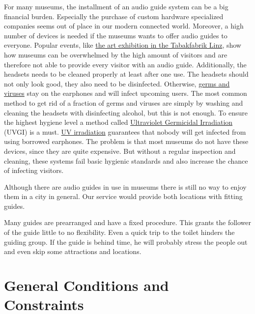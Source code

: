 \documentclass[12pt]{article}
\theoremstyle{definition}
\newenvironment{text}{
}{}
\begin{document}
\begin{text}
For many museums, the installment of an audio guide system can be a big financial burden. Especially the purchase of  custom hardware specialized companies seems out of place in our modern connected world. Moreover, a  high number of devices is needed if the museums wants to offer audio guides to everyone. Popular events, like \href{https://www.tips.at/nachrichten/linz/kultur/459167-oberoesterreich-im-kunstfieber-schon-ueber-15-000-besucher-kamen-zu-den-grossen-meistern-in-die-tabakfabrik-linz}{the art exhibition in the Tabakfabrik Linz}, show how museums can be overwhelmed by the high amount of visitors and are therefore not able to provide every visitor with an audio guide.
Additionally, the headsets needs to be cleaned properly at least after one use.
The headsets should not only look good, they also need to be disinfected. Otherwise, \href{https://www.sciencedirect.com/science/article/abs/pii/S019607098580048X}{germs and viruses} stay on the earphones and will infect upcoming users. The most common method to get rid of a fraction of germs and viruses are simply by washing and cleaning the headsets with disinfecting alcohol, but this is not enough. To ensure the highest hygiene level a method called \href{https://www.ncbi.nlm.nih.gov/pmc/articles/PMC6379899/}{Ultraviolet Germicidal Irradiation} (UVGI) is a must. \href{https://pubs.asha.org/doi/abs/10.1044/jshr.1202.326}{UV irradiation} guarantees that nobody will get infected from using borrowed earphones. The problem is that most museums do not have these devices, since they are quite expensive.
But without a regular inspection and cleaning, these systems fail basic hygienic standards and also increase the chance of infecting visitors.
\newline

Although there are audio guides in use in museums there is still no way to enjoy them in a city in general. Our service would provide both locations with fitting guides.

Many guides are prearranged and have a fixed procedure. This grants the follower of the guide little to no flexibility. Even a quick trip to the toilet hinders the guiding group. If the guide is behind time, he will probably stress the people out and even skip some attractions and locations. 
\end{text}
 
\pagebreak
 
\section{General Conditions and Constraints}
\end{document}
